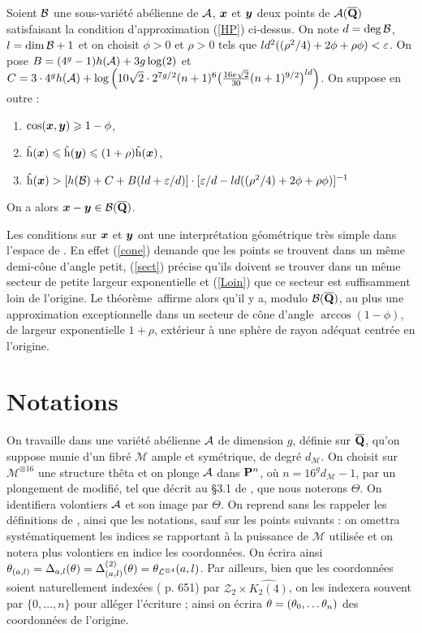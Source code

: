 \begin{thm} \label{Mumford}
 Soient $\mathcal B$ une sous-variété abélienne de $\mathcal A$, ${\boldsymbol{x}}$ et ${\boldsymbol{y}}$ deux points
 de $\mathcal A(\overline{{\mathbf{Q}}})$ satisfaisant la condition d'approximation (\ref{HP})
 ci-dessus. On note $d = \deg \mathcal B$, $l = \dim\mathcal B + 1$ et on choisit $\phi > 0$
 et $\rho > 0$ tels que $ld^2((\rho^2/4) + 2\phi + \rho\phi)< \varepsilon$. On pose
 $B = (4^g-1)h(\mathcal A) + 3g\log(2)$ et $C = 3\cdot4^gh(\mathcal A) + \log\Big(
 10\sqrt2\cdot 2^{7g/2} (n+1)^6\big(\frac{16e\sqrt
   2}{30}(n+1)^{9/2}\big)^{ld}\Big)$. On suppose en outre :
 \begin{enumerate}
  \item $\cos({\boldsymbol{x}},{\boldsymbol{y}}) \geqslant 1-\phi$, \label{cone}
  \item $\smash{\hat{\mathrm h}}({\boldsymbol{x}}) \leqslant \smash{\hat{\mathrm h}}({\boldsymbol{y}}) \leqslant (1+\rho)\smash{\hat{\mathrm h}}({\boldsymbol{x}})$, \label{sect}
  \item $\smash{\hat{\mathrm h}}({\boldsymbol{x}}) > [h(\mathcal B) + C + B(ld + \varepsilon/d)] \cdot [\varepsilon/d -
  ld((\rho^2/4) + 2\phi + \rho\phi)]^{-1}$\label{Loin}
  \end{enumerate}
 On a alors ${\boldsymbol{x}} - {\boldsymbol{y}} \in \mathcal B(\overline{{\mathbf{Q}}})$.
\end{thm}

Les conditions sur ${\boldsymbol{x}}$ et ${\boldsymbol{y}}$ ont une interprétation géométrique très
simple dans l'espace de . En effet (\ref{cone}) demande que
les points se trouvent dans un même demi-cône d'angle petit, (\ref{sect})
précise qu'ils doivent se trouver dans un même secteur de petite largeur
exponentielle et (\ref{Loin}) que ce secteur est suffisamment loin de
l'origine. Le théorème~affirme alors qu'il y a, modulo $\mathcal B(\overline{{\mathbf{Q}}})$, au plus
une approximation exceptionnelle dans un secteur de cône d'angle
$\arccos(1-\phi)$, de largeur exponentielle $1+\rho$, extérieur à une sphère
de rayon adéquat centrée en l'origine.

  \section{Notations}

On travaille dans une variété abélienne $\mathcal A$ de dimension $g$, définie sur
$\overline{{\mathbf{Q}}}$, qu'on suppose munie d'un fibré $\mathcal{M}$ ample et symétrique, de
degré $d_\mathcal{M}$. On choisit sur $\mathcal{M}^{\otimes 16}$ une structure
thêta et on plonge $\mathcal A$ dans ${\mathbf{P}}^n$, où $n=16^g d_\mathcal{M} - 1$, par un
plongement de  modifié, tel que décrit au §3.1 de
\cite{daphimhva2}, que nous noterons $\Theta$. On identifiera volontiers
$\mathcal A$ et son image par $\Theta$. On reprend sans les rappeler les définitions
de , ainsi que les notations, sauf sur les points suivants : on
omettra systématiquement les indices se rapportant à la puissance de
$\mathcal{M}$ utilisée et on notera plus volontiers en indice les coordonnées.
On écrira ainsi $\theta_{(a, l)} = \Delta_{a, l}(\theta)  = \Delta_{(a,
  l)}^{(2)}(\theta) = \theta_{\mathcal{L}^{\otimes 4}}(a, l)$. Par ailleurs, bien
que les coordonnées soient naturellement indexées ( p. 651) par
$\mathcal{Z}_2 \times \widehat{K_2(4)}$, on les indexera souvent par $\{0,
  \dots, n\}$ pour alléger l'écriture  ; ainsi on écrira $\theta = (\theta_0,
\dots \theta_n)$ des coordonnées de l'origine.

